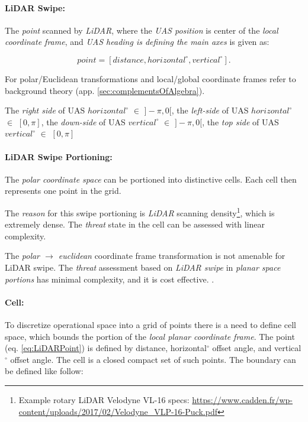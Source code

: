 \paragraph{LiDAR Swipe:} The \emph{point} scanned by \emph{LiDAR}, where the \emph{UAS position} is center of the \emph{local coordinate frame}, and \emph{UAS heading is defining the main axes} is given as:

\begin{equation}\label{eq:LiDARPoint}
    point = [distance,horizontal^\circ,vertical^\circ].
\end{equation}

\begin{note}
    For polar/Euclidean transformations and local/global coordinate frames refer to background theory (app. \ref{sec:complementsOfAlgebra}). 
    
    The \emph{right side} of UAS $horizontal^\circ$ $\in$ $]-\pi,0[$, the \emph{left-side} of UAS $horizontal^\circ$ $\in$ $[0,\pi]$, the \emph{down-side} of UAS $vertical^\circ$ $\in$ $]-\pi,0[$, the \emph{top side} of UAS $vertical^\circ$ $\in$ $[0,\pi]$
\end{note}

\paragraph{LiDAR Swipe Portioning:} The \emph{polar coordinate space} can be portioned into distinctive cells. Each cell then represents one point in the grid.

The \emph{reason} for this swipe portioning is \emph{LiDAR} scanning density\footnote{Example rotary LiDAR Velodyne VL-16 specs: \url{https://www.cadden.fr/wp-content/uploads/2017/02/Velodyne_VLP-16-Puck.pdf}}, which is extremely dense. The \emph{threat} state in the cell can be assessed with linear complexity. 

The \emph{polar $\to$ euclidean} coordinate frame transformation is not amenable  for LiDAR swipe. The \emph{threat} assessment based on \emph{LiDAR swipe} in \emph{planar space portions} has minimal complexity, and it is cost effective. \cite{gupta2010comparative}.


\paragraph{Cell:} To discretize operational space into a grid of points there is a need to define cell space, which bounds the portion of the \emph{local planar coordinate frame}. The point (eq. \ref{eq:LiDARPoint}) is defined by distance, horizontal$^\circ$ offset angle, and vertical$^\circ$ offset angle. The cell is a closed compact set of such points. The boundary can be defined like follow: 

